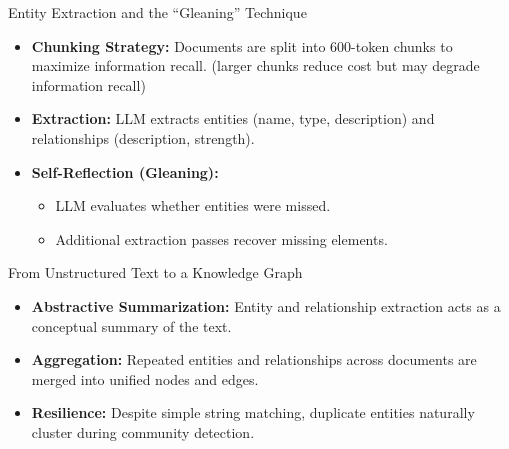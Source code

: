\documentclass[aspectratio=169,xcolor=dvipsnames]{beamer}
\begin{document}
	\begin{frame}{Entity Extraction and the ``Gleaning'' Technique}
		
		\begin{itemize}
			\item \textbf{Chunking Strategy:} Documents are split into 600-token chunks to maximize information recall. (larger chunks reduce cost but may degrade information recall)
			
			\item \textbf{Extraction:} LLM extracts entities (name, type, description) and relationships (description, strength).
			
			\item \textbf{Self-Reflection (Gleaning):} 
			\begin{itemize}
				\item LLM evaluates whether entities were missed.
				\item Additional extraction passes recover missing elements.
			\end{itemize}
		\end{itemize}
		
	\end{frame}
	
	\begin{frame}{From Unstructured Text to a Knowledge Graph}
		
		\begin{itemize}
			\item \textbf{Abstractive Summarization:} Entity and relationship extraction acts as a conceptual summary of the text.
			
			\item \textbf{Aggregation:} Repeated entities and relationships across documents are merged into unified nodes and edges.
			
			\item \textbf{Resilience:} Despite simple string matching, duplicate entities naturally cluster during community detection.
		\end{itemize}
		
	\end{frame}
	
\end{document}

